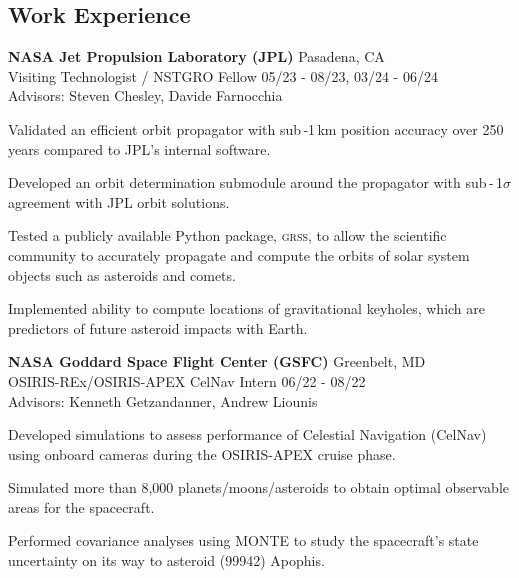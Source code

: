 \documentclass[margin,line]{res}
\newlength{\myitemspacing}
\newenvironment{list_new}{
    \begin{list}{\scriptsize{$\bullet$}}{%
        \setlength{\itemsep}{0in}
        \setlength{\parsep}{\myitemspacing} \setlength{\parskip}{0in}
        \setlength{\topsep}{0in} \setlength{\partopsep}{0in} 
        \setlength{\leftmargin}{0.2in}
        }}
    {\end{list}
}
\begin{document}
\begin{resume}
\section{\sc Work Experience}
{\bf NASA Jet Propulsion Laboratory (JPL)} \hfill Pasadena, CA\\
Visiting Technologist / NSTGRO Fellow \hfill 05/23 - 08/23, 03/24 - 06/24\\
Advisors: Steven Chesley, Davide Farnocchia
\begin{list_new}
    \item Validated an efficient orbit propagator with sub\,-1\,km position accuracy over 250 years compared to JPL's internal software.
    \item Developed an orbit determination submodule around the propagator with sub\,-\,1$\sigma$ agreement with JPL orbit solutions.
    \item Tested a publicly available Python package, \textsc{grss}, to allow the scientific community to accurately propagate and compute the orbits of solar system objects such as asteroids and comets.
    \item Implemented ability to compute locations of gravitational keyholes, which are predictors of future asteroid impacts with Earth.
\end{list_new}
{\bf NASA Goddard Space Flight Center (GSFC)} \hfill Greenbelt, MD\\
OSIRIS-REx/OSIRIS-APEX CelNav Intern \hfill 06/22 - 08/22\\
Advisors: Kenneth Getzandanner, Andrew Liounis
\begin{list_new}
    \item Developed simulations to assess performance of Celestial Navigation (CelNav) using onboard cameras during the OSIRIS-APEX cruise phase.
    \item Simulated more than 8,000 planets/moons/asteroids to obtain optimal observable areas for the spacecraft.
    \item Performed covariance analyses using MONTE to study the spacecraft's state uncertainty on its way to asteroid (99942) Apophis.
\end{list_new}


\end{resume}
\end{document}
